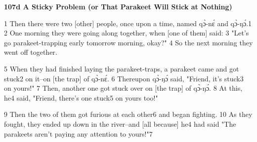 
\textbf{107d A Sticky Problem (or That Parakeet Will Stick at Nothing)}

1 Then there were two [other] people, once upon a time, named qɔ̀-nɛ́ and qɔ̀-ŋɔ́.1
2 One morning they were going along together, when [one of them] said: 3 "Let's
go parakeet-trapping early tomorrow morning, okay?" 4 So the next morning
they went off together.

5 When they had finished laying the parakeet-traps, a parakeet came and got stuck2
on it--on [the trap] of qɔ̀-nɛ́. 6 Thereupon qɔ̀-ŋɔ́ said, "Friend,
it's stuck3 on yours!" 7 Then, another one got stuck over on [the trap]
of qɔ̀-ŋɔ́. 8 At this, he4 said, "Friend, there's one stuck5 on yours
too!"

9 Then the two of them got furious at each other6 and began fighting. 10 As they
fought, they ended up down in the river--and [all because] he4 had said "The
parakeets aren't paying any attention to yours!"7

